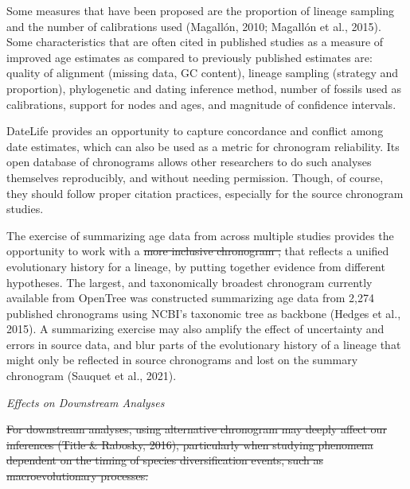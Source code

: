 \documentclass[english,man]{apa6}
\providecommand{\DIFaddtex}[1]{{\protect\color{blue}\uwave{#1}}} %
\providecommand{\DIFdeltex}[1]{{\protect\color{red}\sout{#1}}}                      %
\providecommand{\DIFaddbegin}{} %
\providecommand{\DIFaddend}{} %
\providecommand{\DIFdelbegin}{} %
\providecommand{\DIFdelend}{} %
\providecommand{\DIFadd}[1]{\texorpdfstring{\DIFaddtex{#1}}{#1}} %
\providecommand{\DIFdel}[1]{\texorpdfstring{\DIFdeltex{#1}}{}} %
\newcommand{\DIFscaledelfig}{0.5}
\newlength{\DIFdelgraphicswidth} %
\newlength{\DIFdelgraphicsheight} %
\newcommand{\DIFaddincludegraphics}[2][]{{\color{blue}\fbox{\DIFOincludegraphics[#1]{#2}}}} %
\newcommand{\DIFdelincludegraphics}[2][]{%
\sbox{\DIFdelgraphicsbox}{\DIFOincludegraphics[#1]{#2}}%
\settoboxwidth{\DIFdelgraphicswidth}{\DIFdelgraphicsbox} %
\settoboxtotalheight{\DIFdelgraphicsheight}{\DIFdelgraphicsbox} %
\scalebox{\DIFscaledelfig}{%
\parbox[b]{\DIFdelgraphicswidth}{\usebox{\DIFdelgraphicsbox}\\[-\baselineskip] \rule{\DIFdelgraphicswidth}{0em}}\llap{\resizebox{\DIFdelgraphicswidth}{\DIFdelgraphicsheight}{%
\setlength{\unitlength}{\DIFdelgraphicswidth}%
\begin{picture}(1,1)%
\thicklines\linethickness{2pt} %
{\color[rgb]{1,0,0}\put(0,0){\framebox(1,1){}}}%
{\color[rgb]{1,0,0}\put(0,0){\line( 1,1){1}}}%
{\color[rgb]{1,0,0}\put(0,1){\line(1,-1){1}}}%
\end{picture}%
}\hspace*{3pt}}} %
} %
\DeclareRobustCommand{\DIFaddbegin}{\DIFOaddbegin \let\includegraphics\DIFaddincludegraphics} %
\DeclareRobustCommand{\DIFaddend}{\DIFOaddend \let\includegraphics\DIFOincludegraphics} %
\DeclareRobustCommand{\DIFdelbegin}{\DIFOdelbegin \let\includegraphics\DIFdelincludegraphics} %
\DeclareRobustCommand{\DIFdelend}{\DIFOaddend \let\includegraphics\DIFOincludegraphics} %
\begin{document}
Some measures that have been proposed are the proportion of lineage sampling and the number of calibrations used (Magallón, 2010; Magallón et al., 2015).
Some characteristics that are often cited in published studies as a measure of improved age estimates as compared to previously published estimates are: quality of alignment (missing data, GC content), lineage sampling (strategy and proportion), phylogenetic and dating inference method, number of fossils used as calibrations, support for nodes and ages, and magnitude of confidence intervals.

DateLife provides an opportunity to capture concordance and conflict among date estimates, which can also be used as a metric for chronogram reliability.
Its open database of chronograms allows other researchers to do such analyses themselves reproducibly, and without needing permission. Though, of course, they should follow proper citation practices, especially for the source chronogram studies.

The exercise of summarizing age data from across multiple studies provides the opportunity to work with a \DIFdelbegin \DIFdel{more inclusive chronogram ,
}\DIFdelend \DIFaddbegin \DIFadd{chronogram }\DIFaddend that reflects a unified evolutionary history for a lineage, by putting together evidence from different hypotheses.
The largest, and taxonomically broadest chronogram currently available from OpenTree was constructed summarizing age data from 2,274 published chronograms using NCBI's taxonomic tree as backbone (Hedges et al., 2015).
A summarizing exercise may also amplify the effect of uncertainty and errors in source data, and blur parts of the evolutionary history of a lineage that might only be reflected in source chronograms and lost on the summary chronogram (Sauquet et al., 2021).

\begin{center}
\emph{Effects \DIFaddbegin \DIFadd{of Taxon Sampling }\DIFaddend on Downstream Analyses}
\end{center}

\DIFdelbegin \DIFdel{For downstream analyses, using alternative chronogram may deeply affect our inferences (Title \& Rabosky, 2016), particularly when studying phenomena dependent on the timing of species diversification events, such as macroevolutionary processes.
}%
\end{document}

